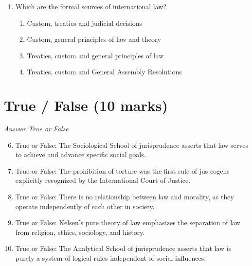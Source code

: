 \documentclass[12pt]{article}
\begin{document}
\begin{enumerate}[label=\arabic*.]
\begin{enumerate}[label=(\alph*)]
    \item Piracy jure gentium is subject to flag State jurisdiction
    \item Piracy jure gentium is subject to universal jurisdiction
    \item Piracy jure gentium is subject to port State jurisdiction
    \item Piracy jure gentium is subject to nationality-based jurisdiction
\end{enumerate}
\item Which are the formal sources of international law?
\begin{enumerate}[label=(\alph*)]
    \item Custom, treaties and judicial decisions
    \item Custom, general principles of law and theory
    \item Treaties, custom and general principles of law
    \item Treaties, custom and General Assembly Resolutions
\end{enumerate}
\end{enumerate}

\section*{True / False (10 marks)}
\textit{Answer True or False}
\begin{enumerate}[label=\arabic*.]
\setcounter{enumi}{5}
\item True or False: The Sociological School of jurisprudence asserts that law serves to achieve and advance specific social goals.
\item True or False: The prohibition of torture was the first rule of jus cogens explicitly recognized by the International Court of Justice.
\item True or False: There is no relationship between law and morality, as they operate independently of each other in society.
\item True or False: Kelsen's pure theory of law emphasizes the separation of law from religion, ethics, sociology, and history.
\item True or False: The Analytical School of jurisprudence asserts that law is purely a system of logical rules independent of social influences.
\end{enumerate}
\end{document}

